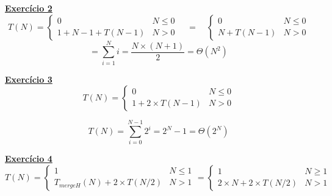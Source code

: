 \documentclass[a4paper,11pt]{article}
\begin{document}
	\noindent \underline{\textbf{Exercício 2}}\\
	
	\[
		T(N) =
		\begin{cases}
			0 & N \leq 0 \\
			1 + N - 1 + T(N - 1) & N > 0
		\end{cases}
		\quad = \quad
		\begin{cases}
			0 & N \leq 0 \\
			N + T(N - 1) & N > 0
		\end{cases}
	\]
	\[
		= \sum_{i=1}^{N} i = \frac{N \times (N + 1)}{2} = \Theta(N^2)
	\]
	
	
	\noindent \underline{\textbf{Exercício 3}}\\
	
	\[
		T(N) = 
		\begin{cases}
			0 & N \leq 0 \\
			1 + 2 \times T(N - 1) & N > 0
		\end{cases}
	\]
	
	\begin{figure}[h]
		\centering
	\end{figure}
	
	\[
		T(N) = \sum_{i=0}^{N-1} 2^i = 2^N - 1 = \Theta(2^N)
	\]
	
	\newpage
	
	\noindent \underline{\textbf{Exercício 4}}\\
	
	\[
		T(N) = 
		\begin{cases}
			1 & N \leq 1 \\
			T_{mergeH}(N) + 2 \times T(N / 2) & N > 1
		\end{cases}
		=
		\begin{cases}
			1 & N \geq 1 \\
			2 \times N + 2 \times T(N/2) & N > 1
		\end{cases}
	\]
	
\end{document}
